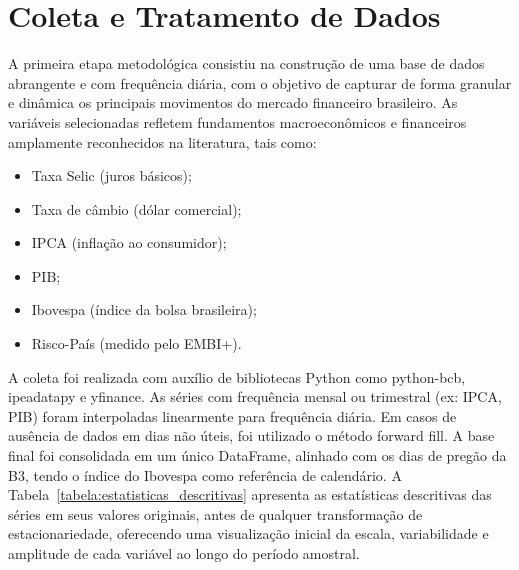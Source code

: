 \documentclass[	12pt, Times, openright, oneside, a4paper, english, brazil]{abntex2}
\begin{document}
\section{Coleta e Tratamento de Dados}

A primeira etapa metodológica consistiu na construção de uma base de dados abrangente e com frequência diária, com o objetivo de capturar de forma granular e dinâmica os principais movimentos do mercado financeiro brasileiro. As variáveis selecionadas refletem fundamentos macroeconômicos e financeiros amplamente reconhecidos na literatura, tais como:

\begin{itemize}
\item Taxa Selic (juros básicos);
\item Taxa de câmbio (dólar comercial);
\item IPCA (inflação ao consumidor);
\item PIB;
\item Ibovespa (índice da bolsa brasileira);
\item Risco-País (medido pelo EMBI+).
\end{itemize}

A coleta foi realizada com auxílio de bibliotecas Python como python-bcb, ipeadatapy e yfinance. As séries com frequência mensal ou trimestral (ex: IPCA, PIB) foram interpoladas linearmente para frequência diária. Em casos de ausência de dados em dias não úteis, foi utilizado o método forward fill. A base final foi consolidada em um único DataFrame, alinhado com os dias de pregão da B3, tendo o índice do Ibovespa como referência de calendário. A Tabela~\ref{tabela:estatisticas_descritivas} apresenta as estatísticas descritivas das séries em seus valores originais, antes de qualquer transformação de estacionariedade, oferecendo uma visualização inicial da escala, variabilidade e amplitude de cada variável ao longo do período amostral.
\end{document}
